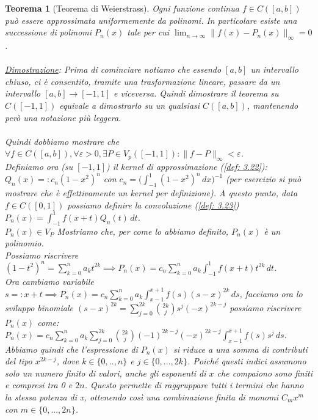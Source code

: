 \documentclass[a4paper,12pt]{report}
\newtheorem{teorema}{Teorema}[chapter]
\newcommand{\lt}{<}
\newcommand{\gt}{>}
\begin{document}
\begin{teorema}[Teorema di Weierstrass]\label{thm: 3.11}
    Ogni funzione continua $f\in C([a,b])$ può essere approssimata uniformemente da polinomi. In particolare esiste una successione di polinomi $P_n(x)$ tale per cui $\displaystyle\lim_{n\to\infty}\|f(x)-P_n(x)\|_\infty=0$.
    \\
    \\ \underline{Dimostrazione}:  Prima di cominciare notiamo che essendo $[a,b]$ un intervallo chiuso, ci è consentito, tramite una trasformazione lineare, passare da un intervallo $[a,b] \to [-1,1]$ e viceversa. Quindi dimostrare il teorema su $C([-1,1])$ equivale a dimostrarlo su un qualsiasi $C([a,b])$, mantenendo però una notazione più leggera.
    \\
    \\ Quindi dobbiamo mostrare che $\forall f \in C([a,b]), \forall \varepsilon \gt 0, \exists P\in V_p([-1,1]):\|f-P\|_\infty \lt \varepsilon$.
    \\ Definiamo ora (su $[-1,1]$) il kernel di approssimazione (\ref{def: 3.22}):
    \\$Q_n(x)=:c_n(1-x^2)^n$ con $c_n=\displaystyle\bigg(\int_{-1}^1(1-x^2)^n\,dx\bigg)^{-1}$ (per esercizio si può mostrare che è effettivamente un kernel per definizione). A questo punto, data $f\in C([0,1])$ possiamo definire la convoluzione (\ref{def: 3.23}) $P_n(x)=\displaystyle\int_{-1}^1f(x+t)Q_n(t)\,dt$.
    \\$\boxed{P_n(x) \in V_P}$ Mostriamo che, per come lo abbiamo definito, $P_n(x)$ è un polinomio.
    \\ Possiamo riscrivere $(1-t^2)^n=\displaystyle\sum_{k=0}^na_kt^{2k}\implies P_n(x)=c_n\sum_{k=0}^na_k\int_{-1}^1f(x+t)t^{2k}\,dt$.
    \\ Ora cambiamo variabile $s=:x+t\implies P_n(x)=c_n\displaystyle\sum_{k=0}^na_k\int_{x-1}^{x+1}f(s)(s-x)^{2k}\,ds$, facciamo ora lo sviluppo binomiale $(s-x)^{2k}=\displaystyle\sum_{j=0}^{2k}\binom{2k}{j}s^j(-x)^{2k-j}$ possiamo riscrivere $P_n(x)$ come:
    $P_n(x)=c_n\displaystyle\sum_{k=0}^na_k\sum_{j=0}^{2k}\binom{2k}{j}(-1)^{2k-j}(-x)^{2k-j}\int_{x-1}^{x+1}f(s)s^j\,ds$. 
    \\Abbiamo quindi che l’espressione di $P_n(x) $ si riduce a una somma di contributi del tipo $x^{2k-j}$, dove $k\in\{0,..,n\}$ e $j\in\{0,...,2k\}$. Poiché questi indici assumono solo un numero finito di valori, anche gli esponenti di $x$ che compaiono sono finiti e compresi tra 0 e $2n$. Questo permette di raggruppare tutti i termini che hanno la stessa potenza di x, ottenendo così una combinazione finita di monomi $C_mx^m$ con $m\in\{0,...,2n\}$.

\end{teorema}
\end{document}
